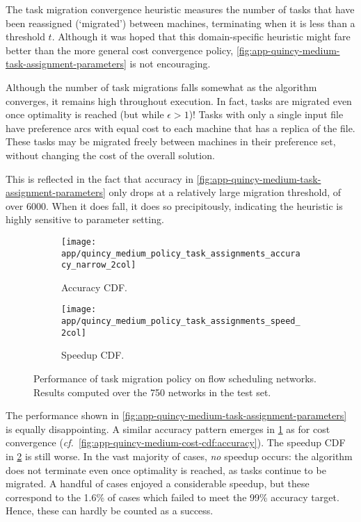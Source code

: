 The task migration convergence heuristic measures the number of tasks that have been reassigned (`migrated') between machines, terminating when it is less than a threshold $t$. Although it was hoped that this domain-specific heuristic might fare better than the more general cost convergence policy, \cref{fig:app-quincy-medium-task-assignment-parameters} is not encouraging. 

Although the number of task migrations falls somewhat as the algorithm converges, it remains high throughout execution. In fact, tasks are migrated even once optimality is reached (but while $\epsilon > 1$)! Tasks with only a single input file have preference arcs with equal cost to each machine that has a replica of the file. These tasks may be migrated freely between machines in their preference set, without changing the cost of the overall solution.

This is reflected in the fact that accuracy in \cref{fig:app-quincy-medium-task-assignment-parameters} only drops at a relatively large migration threshold, of over $6000$. When it does fall, it does so precipitously, indicating the heuristic is highly sensitive to parameter setting.

\begin{figure}
    \begin{widepage}
        \begin{subfigure}[c]{0.5\textwidth}
            \texttt{[image: app/quincy\_medium\_policy\_task\_assignments\_accuracy\_narrow\_2col]}
            \caption{Accuracy CDF.}
            \label{fig:app-quincy-medium-task-assignment-cdf:accuracy}
        \end{subfigure}
        \begin{subfigure}[c]{0.5\textwidth}
            \texttt{[image: app/quincy\_medium\_policy\_task\_assignments\_speed\_2col]}
            \caption{Speedup CDF.}
            \label{fig:app-quincy-medium-task-assignment-cdf:speedup}
        \end{subfigure}
    \end{widepage}
    \caption[Performance of task migration policy on flow scheduling networks]{Performance of task migration policy on flow scheduling networks. Results computed over the 750 networks in the test set.}
    \label{fig:app-quincy-medium-task-assignment-cdf}
\end{figure}

The performance shown in \cref{fig:app-quincy-medium-task-assignment-parameters} is equally disappointing. A similar accuracy pattern emerges in \cref{fig:app-quincy-medium-task-assignment-cdf:accuracy} as for cost convergence (\textit{cf.}\ \cref{fig:app-quincy-medium-cost-cdf:accuracy}). The speedup CDF in \cref{fig:app-quincy-medium-task-assignment-cdf:speedup} is still worse. In the vast majority of cases, \emph{no} speedup occurs: the algorithm does not terminate even once optimality is reached, as tasks continue to be migrated. A handful of cases enjoyed a considerable speedup, but these correspond to the 1.6\% of cases which failed to meet the 99\% accuracy target. Hence, these can hardly be counted as a success.

